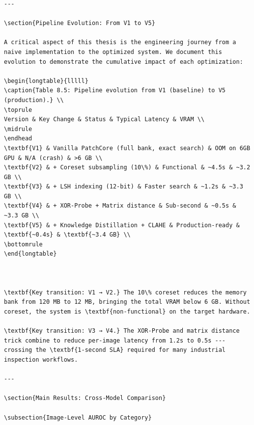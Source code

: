 \documentclass[12pt,a4paper,oneside]{report}
\begin{document}
\begin{verbatim}
---

\section{Pipeline Evolution: From V1 to V5}

A critical aspect of this thesis is the engineering journey from a naive implementation to the optimized system. We document this evolution to demonstrate the cumulative impact of each optimization:

\begin{longtable}{lllll}
\caption{Table 8.5: Pipeline evolution from V1 (baseline) to V5 (production).} \\
\toprule
Version & Key Change & Status & Typical Latency & VRAM \\
\midrule
\endhead
\textbf{V1} & Vanilla PatchCore (full bank, exact search) & OOM on 6GB GPU & N/A (crash) & >6 GB \\
\textbf{V2} & + Coreset subsampling (10\%) & Functional & ~4.5s & ~3.2 GB \\
\textbf{V3} & + LSH indexing (12-bit) & Faster search & ~1.2s & ~3.3 GB \\
\textbf{V4} & + XOR-Probe + Matrix distance & Sub-second & ~0.5s & ~3.3 GB \\
\textbf{V5} & + Knowledge Distillation + CLAHE & Production-ready & \textbf{~0.4s} & \textbf{~3.4 GB} \\
\bottomrule
\end{longtable}



\textbf{Key transition: V1 → V2.} The 10\% coreset reduces the memory bank from 120 MB to 12 MB, bringing the total VRAM below 6 GB. Without coreset, the system is \textbf{non-functional} on the target hardware.

\textbf{Key transition: V3 → V4.} The XOR-Probe and matrix distance trick combine to reduce per-image latency from 1.2s to 0.5s --- crossing the \textbf{1-second SLA} required for many industrial inspection workflows.

---

\section{Main Results: Cross-Model Comparison}

\subsection{Image-Level AUROC by Category}


\end{verbatim}
\end{document}
